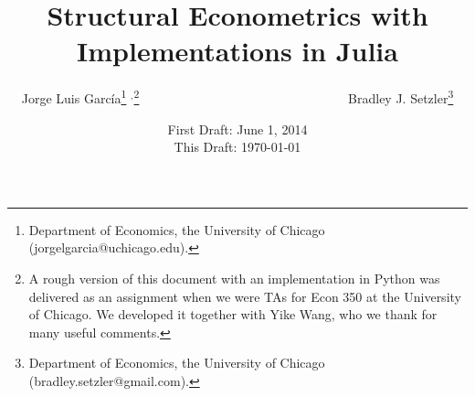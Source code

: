 



\title{\textbf{Structural Econometrics with Implementations in Julia}}
\author{Jorge Luis Garc\'{i}a\thanks{Department of Economics, the University of Chicago (jorgelgarcia@uchicago.edu).} $^{,}$\thanks{A rough version of this document with an implementation in Python was delivered as an assignment when we were TAs for Econ 350 at the University of Chicago. We developed it together with Yike Wang, who we thank for many useful comments.} \ \ \ \ \ \ \ \ \ \ \ \ \ \ \ \ \ \ \ \ \ \ \ \ \ \ \ \ \ \ \ \ Bradley J. Setzler\thanks{Department of Economics, the University of Chicago (bradley.setzler@gmail.com).}}
\date{First Draft: June 1, 2014 \\ This Draft: \today}
\maketitle

\setcounter{section}{1}

